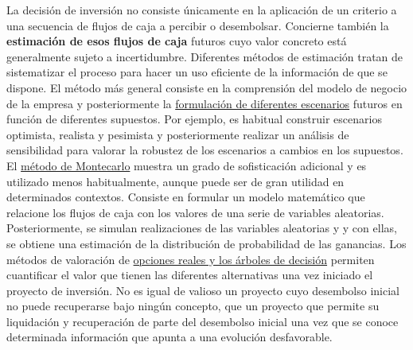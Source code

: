 \documentclass{nuevotema}
\begin{document}
La decisión de inversión no consiste únicamente en la aplicación de un criterio a una secuencia de flujos de caja a percibir o desembolsar. Concierne también la \textbf{estimación de esos flujos de caja} futuros cuyo valor concreto está generalmente sujeto a incertidumbre. Diferentes métodos de estimación tratan de sistematizar el proceso para hacer un uso eficiente de la información de que se dispone. El método más general consiste en la comprensión del modelo de negocio de la empresa y posteriormente la \underline{formulación de diferentes escenarios} futuros en función de diferentes supuestos. Por ejemplo, es habitual construir escenarios optimista, realista y pesimista y posteriormente realizar un análisis de sensibilidad para valorar la robustez de los escenarios a cambios en los supuestos. El \underline{método de Montecarlo} muestra un grado de sofisticación adicional y es utilizado menos habitualmente, aunque puede ser de gran utilidad en determinados contextos. Consiste en formular un modelo matemático que relacione los flujos de caja con los valores de una serie de variables aleatorias. Posteriormente, se simulan realizaciones de las variables aleatorias y y con ellas, se obtiene una estimación de la distribución de probabilidad de las ganancias. Los métodos de valoración de \underline{opciones reales y los árboles de decisión} permiten cuantificar el valor que tienen las diferentes alternativas una vez iniciado el proyecto de inversión. No es igual de valioso un proyecto cuyo desembolso inicial no puede recuperarse bajo ningún concepto, que un proyecto que permite su liquidación y recuperación de parte del desembolso inicial una vez que se conoce determinada información que apunta a una evolución desfavorable. 
\end{document}

